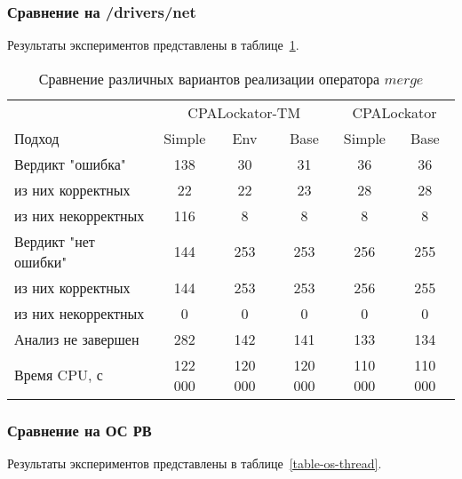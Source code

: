 
\subsubsection{Сравнение на /drivers/net}
Результаты экспериментов представлены в таблице~\ref{table-drivers-thread}.

\begin{center}
  \begin{table}[h]\footnotesize \centering
  	\label{table-drivers-thread}
    \caption{Сравнение различных вариантов реализации оператора $merge$}
    \begin{tabular}{ | l | c | c | c | c | c |}
      \hline
      					& \multicolumn{3}{|c|}{CPALockator-TM} 			& \multicolumn{2}{|c|}{CPALockator} 	\\
      Подход         				& Simple 	& Env 		& Base 		& Simple 	& Base  	\\ \hline
      Вердикт "ошибка" 				& 138    	& 30   		& 31   		& 36        & 36  	 	\\ 
  \hspace{0.5cm} из них корректных 	& 22 		& 22 		& 23   		& 28       	& 28   		\\ 
  \hspace{0.5cm} из них некорректных & 116 		& 8 		& 8   		& 8       	& 8     	\\ \hline
      Вердикт "нет ошибки"  		& 144      	& 253    	& 253    	& 256      	& 255     	\\ 
  \hspace{0.5cm} из них корректных 	& 144 		& 253    	& 253    	& 256       & 255   	\\
  \hspace{0.5cm} из них некорректных & 0 		& 0    		& 0     	& 0         & 0   		\\ \hline
      Анализ не завершен       		& 282     	& 142    	& 141    	& 133      	& 134   	\\ \hline
      Время CPU, с   				& 122 000 	& 120 000 	& 120 000 	& 110 000  	& 110 000   \\ 
      \hline
    \end{tabular}
  \end{table}
\end{center}


\subsubsection{Сравнение на ОС РВ}
Результаты экспериментов представлены в таблице~\ref{table-os-thread}.

